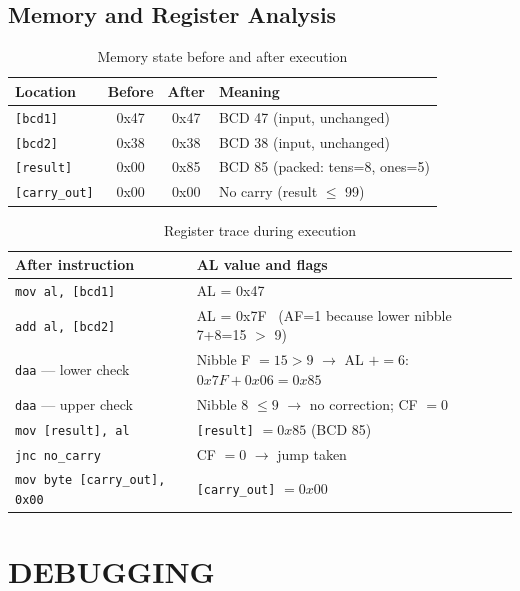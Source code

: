 \documentclass[12pt,a4paper]{article}
\begin{document}
\subsection{Memory and Register Analysis}

\begin{table}[H]
\centering
\caption{Memory state before and after execution}
\begin{tabular}{|l|c|c|p{5cm}|}
\hline
\textbf{Location} & \textbf{Before} & \textbf{After} & \textbf{Meaning} \\
\hline
\texttt{[bcd1]}      & 0x47 & 0x47 & BCD 47 (input, unchanged) \\
\hline
\texttt{[bcd2]}      & 0x38 & 0x38 & BCD 38 (input, unchanged) \\
\hline
\texttt{[result]}    & 0x00 & 0x85 & BCD 85 (packed: tens=8, ones=5) \\
\hline
\texttt{[carry\_out]} & 0x00 & 0x00 & No carry (result $\leq$ 99) \\
\hline
\end{tabular}
\end{table}

\begin{table}[H]
\centering
\caption{Register trace during execution}
\small
\begin{tabular}{|l|l|}
\hline
\textbf{After instruction} & \textbf{AL value and flags} \\
\hline
\texttt{mov al, [bcd1]}  & AL = 0x47 \\
\hline
\texttt{add al, [bcd2]}  & AL = 0x7F \ (AF=1 because lower nibble 7+8=15 $>$ 9) \\
\hline
\texttt{daa} --- lower check  & Nibble F $= 15 > 9$ $\to$ AL $+= 6$: $0x7F + 0x06 = 0x85$ \\
\hline
\texttt{daa} --- upper check  & Nibble 8 $\leq 9$ $\to$ no correction; CF $= 0$ \\
\hline
\texttt{mov [result], al}  & \texttt{[result]} $= 0x85$ (BCD 85) \\
\hline
\texttt{jnc no\_carry}  & CF $= 0$ $\to$ jump taken \\
\hline
\texttt{mov byte [carry\_out], 0x00}  & \texttt{[carry\_out]} $= 0x00$ \\
\hline
\end{tabular}
\end{table}

\newpage
\section{DEBUGGING}
\end{document}
